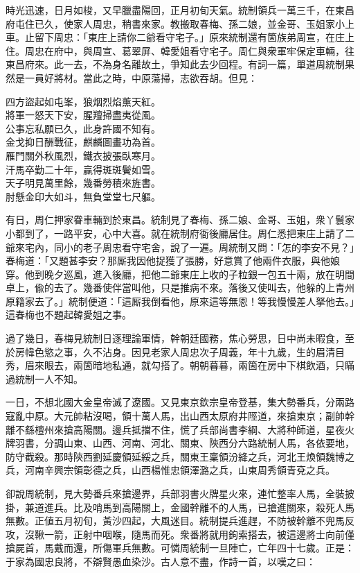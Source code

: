 時光迅速，日月如梭，又早臘盡陽回，正月初旬天氣。統制領兵一萬三千，在東昌府屯住已久，使家人周忠，稍書來家。教搬取春梅、孫二娘，並金哥、玉姐家小上車。止留下周忠：「東庄上請你二爺看守宅子。」原來統制還有箇族弟周宣，在庄上住。周忠在府中，與周宣、葛翠屏、韓愛姐看守宅子。周仁與衆軍牢保定車輛，往東昌府來。此一去，不為身名離故土，爭知此去少回程。有詞一篇，單道周統制果然是一員好將材。當此之時，中原蕩掃，志欲吞胡。但見：

\begin{myquote}
四方盜起如屯峯，狼烟烈焰薰天紅。\\將軍一怒天下安，腥羶掃盡夷從風。\\公事忘私願已久，此身許國不知有。{}\\金戈抑日酬戰征，麒麟圖畫功為首。\\雁門關外秋風烈，鐵衣披張臥寒月。\\汗馬卒勤二十年，贏得斑斑鬢如雪。\\天子明見萬里餘，幾番勞積來旌書。\\肘懸金印大如斗，無負堂堂七尺軀。
\end{myquote}

有日，周仁押家眷車輛到於東昌。統制見了春梅、孫二娘、金哥、玉姐，衆丫鬟家小都到了，一路平安，心中大喜。就在統制府衙後廳居住。周仁悉把東庄上請了二爺來宅內，同小的老子周忠看守宅舍，說了一遍。周統制又問：「怎的李安不見？」春梅道：「又題甚李安？那厮我因他捉獲了張勝，好意賞了他兩件衣服，與他娘穿。他到晚夕巡風，進入後廳，把他二爺東庄上收的子粒銀一包五十兩，放在明間卓上，偸的去了。幾番使伴當叫他，只是推病不來。落後又使叫去，他躲的上青州原籍家去了。」統制便道：「這厮我倒看他，原來這等無恩！等我慢慢差人拏他去。」這春梅也不題起韓愛姐之事。

過了幾日，春梅見統制日逐理論軍情，幹朝廷國務，焦心勞思，日中尚未暇食，至於房幃色慾之事，久不沾身。因見老家人周忠次子周義，年十九歲，生的眉清目秀，眉來眼去，兩箇暗地私通，就勾搭了。{}朝朝暮暮，兩箇在房中下棋飲酒，只瞞過統制一人不知。

一日，不想北國大金皇帝滅了遼國。又見東京欽宗皇帝登基，集大勢番兵，分兩路寇亂中原。大元帥粘沒喝，領十萬人馬，出山西太原府井陘道，來搶東京；副帥幹離不繇檀州來搶高陽關。邊兵抵擋不住，慌了兵部尚書李綱、大將种師道，星夜火牌羽書，分調山東、山西、河南、河北、關東、陝西分六路統制人馬，各依要地，防守截殺。那時陝西劉延慶領延綏之兵，關東王稟領汾絳之兵，河北王煥領魏博之兵，河南辛興宗領彰德之兵，山西楊惟忠領澤潞之兵，山東周秀領青兗之兵。

卻說周統制，見大勢番兵來搶邊界，兵部羽書火牌星火來，連忙整率人馬，全裝披掛，兼道進兵。比及哨馬到高陽關上，金國幹離不的人馬，已搶進關來，殺死人馬無數。正値五月初旬，黃沙四起，大風迷目。統制提兵進趕，不防被幹離不兜馬反攻，沒鞦一箭，正射中咽喉，隨馬而死。衆番將就用鉤索搭去，被這邊將士向前僅搶屍首，馬戴而還，所傷軍兵無數。可憐周統制一旦陣亡，亡年四十七歲。正是：于家為國忠良將，不辯賢愚血染沙。古人意不盡，作詩一首，以嘆之曰：

